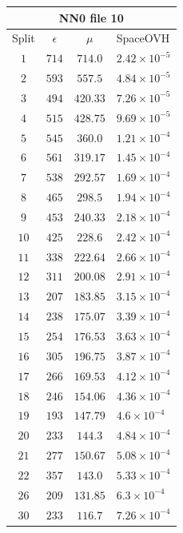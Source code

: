 \documentclass[11pt,a4paper,twoside,
openright]{book}
\begin{document}
	\begin{table}

	
	\begin{tabular}{|c | c | c | l |}
		
		\multicolumn{4}{c}{NN0 file 10} \\
		\hline
		Split & $\epsilon$ & $\mu$ & SpaceOVH \\ \hline
		$1$ & $714$ & $714.0$ & $2.42\times 10^{-5}$ \\ 
		$2$ & $593$ & $557.5$ & $4.84\times 10^{-5}$ \\ 
		$3$ & $494$ & $420.33$ & $7.26\times 10^{-5}$ \\ 
		$4$ & $515$ & $428.75$ & $9.69\times 10^{-5}$ \\ 
		$5$ & $545$ & $360.0$ & $1.21\times 10^{-4}$ \\ 
		$6$ & $561$ & $319.17$ & $1.45\times 10^{-4}$ \\ 
		$7$ & $538$ & $292.57$ & $1.69\times 10^{-4}$ \\ 
		$8$ & $465$ & $298.5$ & $1.94\times 10^{-4}$ \\ 
		$9$ & $453$ & $240.33$ & $2.18\times 10^{-4}$ \\ 
		$10$ & $425$ & $228.6$ & $2.42\times 10^{-4}$ \\ 
		$11$ & $338$ & $222.64$ & $2.66\times 10^{-4}$ \\ 
		$12$ & $311$ & $200.08$ & $2.91\times 10^{-4}$ \\ 
		$13$ & $207$ & $183.85$ & $3.15\times 10^{-4}$ \\ 
		$14$ & $238$ & $175.07$ & $3.39\times 10^{-4}$ \\ 
		$15$ & $254$ & $176.53$ & $3.63\times 10^{-4}$ \\ 
		$16$ & $305$ & $196.75$ & $3.87\times 10^{-4}$ \\ 
		$17$ & $266$ & $169.53$ & $4.12\times 10^{-4}$ \\ 
		$18$ & $246$ & $154.06$ & $4.36\times 10^{-4}$ \\ 
		$19$ & $193$ & $147.79$ & $4.6\times 10^{-4}$ \\ 
		$20$ & $233$ & $144.3$ & $4.84\times 10^{-4}$ \\ 
		$21$ & $277$ & $150.67$ & $5.08\times 10^{-4}$ \\ 
		$22$ & $357$ & $143.0$ & $5.33\times 10^{-4}$ \\ 
		$26$ & $209$ & $131.85$ & $6.3\times 10^{-4}$ \\ 
		$30$ & $233$ & $116.7$ & $7.26\times 10^{-4}$ \\ 

\end{tabular}
\end{table}
\end{document}
